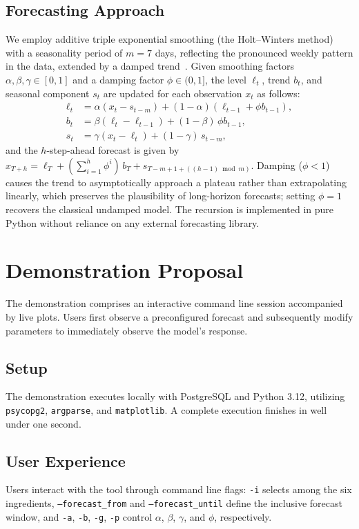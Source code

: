 \documentclass[conference]{IEEEtran}
\begin{document}
\subsection{Forecasting Approach}
We employ additive triple exponential smoothing (the Holt--Winters
method)~\cite{holt2004,winters1960,hyndman2021fpp3} with a seasonality period of $m=7$ days, reflecting
the pronounced weekly pattern in the data, extended by a damped trend~\cite{gardner1985,hyndman2021fpp3}.
Given smoothing factors $\alpha,\beta,\gamma \in [0,1]$ and a damping factor
$\phi \in (0,1]$, the level $\ell_t$, trend $b_t$, and seasonal component $s_t$ are
updated for each observation $x_t$ as follows:
\begin{align}
\ell_t &= \alpha (x_t - s_{t-m}) + (1-\alpha)(\ell_{t-1} + \phi b_{t-1}),\\
b_t &= \beta (\ell_t - \ell_{t-1}) + (1-\beta)\,\phi b_{t-1},\\
s_t &= \gamma (x_t - \ell_t) + (1-\gamma)\,s_{t-m},
\end{align}
and the $h$-step-ahead forecast is given by
$\hat{x}_{T+h} = \ell_T + (\sum_{i=1}^{h}\phi^{i})\,b_T + s_{T-m+1+((h-1) \bmod m)}$.
Damping ($\phi<1$) causes the trend to asymptotically approach a plateau rather than
extrapolating linearly, which preserves the plausibility of long-horizon forecasts;
setting $\phi=1$ recovers the classical undamped model. The recursion is implemented in
pure Python without reliance on any external forecasting library.

\section{Demonstration Proposal}
The demonstration comprises an interactive command line session accompanied by live
plots. Users first observe a preconfigured forecast and subsequently modify parameters
to immediately observe the model's response.

\subsection{Setup}\label{subsec:setup}
The demonstration executes locally with PostgreSQL and Python
3.12, utilizing \texttt{psycopg2}, \texttt{argparse}, and
\texttt{matplotlib}. A complete execution finishes in well under one second.

\subsection{User Experience}
Users interact with the tool through command line flags: \texttt{-i} selects among the
six ingredients, \texttt{--forecast\_from} and \texttt{--forecast\_until} define the
inclusive forecast window, and \texttt{-a}, \texttt{-b}, \texttt{-g}, \texttt{-p}
control $\alpha$, $\beta$, $\gamma$, and $\phi$, respectively.
\end{document}
